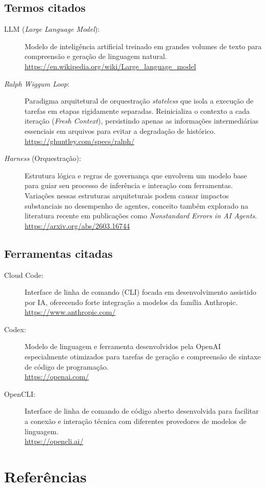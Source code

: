 \documentclass[a4paper,10pt,twocolumn]{article}
\begin{document}
\subsection{Termos citados}
\begin{description}
    \item[LLM (\textit{Large Language Model}):] Modelo de inteligência artificial treinado em grandes volumes de texto para compreensão e geração de linguagem natural. \\ \url{https://en.wikipedia.org/wiki/Large_language_model}

    \item[\textit{Ralph Wiggum Loop}:] Paradigma arquitetural de orquestração \textit{stateless} que isola a execução de tarefas em etapas rigidamente separadas. Reinicializa o contexto a cada iteração (\textit{Fresh Context}), persistindo apenas as informações intermediárias essenciais em arquivos para evitar a degradação de histórico. \\ \url{https://ghuntley.com/specs/ralph/}

    \item[\textit{Harness} (Orquestração):] Estrutura lógica e regras de governança que envolvem um modelo base para guiar seu processo de inferência e interação com ferramentas. Variações nessas estruturas arquiteturais podem causar impactos substanciais no desempenho de agentes, conceito também explorado na literatura recente em publicações como \textit{Nonstandard Errors in AI Agents}. \\ \url{https://arxiv.org/abs/2603.16744}
\end{description}

\subsection{Ferramentas citadas}
\begin{description}
    \item[Cloud Code:] Interface de linha de comando (CLI) focada em desenvolvimento assistido por IA, oferecendo forte integração a modelos da família Anthropic. \\ \url{https://www.anthropic.com/}

    \item[Codex:] Modelo de linguagem e ferramenta desenvolvidos pela OpenAI especialmente otimizados para tarefas de geração e compreensão de sintaxe de código de programação. \\ \url{https://openai.com/}

    \item[OpenCLI:] Interface de linha de comando de código aberto desenvolvida para facilitar a conexão e interação técnica com diferentes provedores de modelos de linguagem. \\ \url{https://opencli.ai/}
\end{description}

\section{Referências}

\printbibliography[heading=none]
\end{document}
